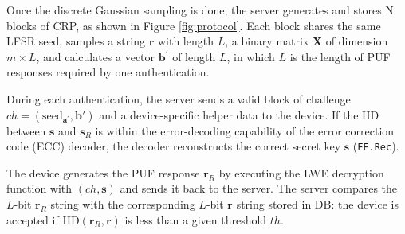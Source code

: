 Once the discrete Gaussian sampling is done, the server generates and stores N blocks of CRP, as shown in Figure \ref{fig:protocol}.
Each block shares the same LFSR seed, samples a string $\mathbf{r}$ with length $L$, a binary matrix $\mathbf{X}$ of dimension $m\times L$, and calculates a vector $\mathbf{b}^\prime$ of length $L$, in which $L$ is the length of PUF responses required by one authentication.  

During each authentication, the server sends a valid block of challenge  $ch=(\text{seed}_{\mathbf{a}^\prime}, \mathbf{b}')$ and a device-specific helper data to the device. 
If the HD between $\mathbf{s}$ and $\mathbf{s}_R$ is within the error-decoding capability of the error correction code (ECC) decoder, the decoder reconstructs the correct secret key $\mathbf{s}$ (\texttt{FE.Rec}). 

The device generates the PUF response $\mathbf{r}_R$ by executing the LWE decryption function with $(ch, \mathbf{s})$ and sends it back to the server. 
The server compares the $L$-bit $\mathbf{r}_R$ string with the corresponding $L$-bit $\mathbf{r}$ string stored in DB:
the device is accepted if $\text{HD}(\mathbf{r}_R, \mathbf{r})$ is less than a given threshold $th$.
